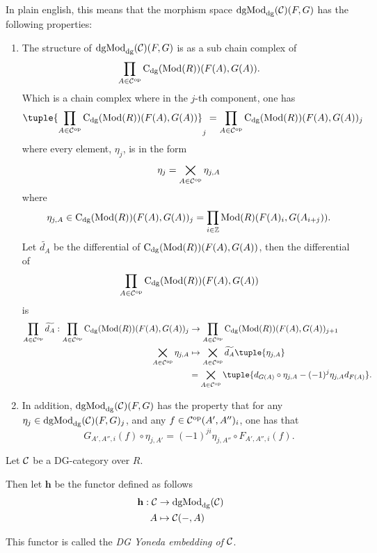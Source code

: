 \begin{remark}
    In plain english, this means that the morphism space \( \operatorname{dgMod}_{\operatorname{dg}}({\mathcal{C}})(F, G) \) has the following properties:
    \begin{enumerate}
        \item {
            The structure of \( \operatorname{dgMod}_{\operatorname{dg}}({\mathcal{C}})(F, G) \) is as a sub chain complex of
            \[
                \prod_{A \in {\mathcal{C}}^{\operatorname{op}}} \operatorname{C}_{\operatorname{dg}}(\operatorname{Mod}(R))(F(A), G(A)).
            \]
            Which is a chain complex where in the \( j \)-th component, one has
            \[
                \tuple{ \prod_{A \in \Cc^{\op}} \C_{\dg}(\Mod(R))(F(A), G(A)) }_j = \prod_{A \in \Cc^{\op}} \C_{\dg}(\Mod(R))(F(A), G(A))_j
            \]
            where every element, \( \eta_j \), is in the form
            \[
                \eta_j = \bigtimes_{A \in {\mathcal{C}}^{\operatorname{op}}} \eta_{j, A}
            \]
            where
            \[
                \eta_{j, A} \in \operatorname{C}_{\operatorname{dg}}(\operatorname{Mod}(R))(F(A), G(A))_j = \prod_{i \in {\mathbb{Z}}} \operatorname{Mod}(R)(F(A)_i, G(A_{i + j})).
            \]
            Let \( \widetilde{d_A} \) be the differential of \( \operatorname{C}_{\operatorname{dg}}(\operatorname{Mod}(R))(F(A), G(A)) \), then the differential of
            \[
                \prod_{A \in {\mathcal{C}}^{\operatorname{op}}} \operatorname{C}_{\operatorname{dg}}(\operatorname{Mod}(R))(F(A), G(A))
            \] is
            \begin{align*}
                \prod_{A \in \Cc^{\op}} \widetilde{d_A} : \prod_{A \in \Cc^{\op}} \C_{\dg}(\Mod(R))(F(A), G(A))_j &\to \prod_{A \in \Cc^{\op}} \C_{\dg}(\Mod(R))(F(A), G(A))_{j + 1} \\
                \bigtimes_{A \in \Cc^{\op}} \eta_{j, A} &\mapsto \bigtimes_{A \in \Cc^{\op}} \widetilde{d_A}\tuple{\eta_{j, A}} \\
                &= \bigtimes_{A \in \Cc^{\op}} \tuple{ d_{G(A)} \circ \eta_{j, A} - (-1)^j \eta_{j, A} d_{F(A)} }.
            \end{align*}
        }
        \item {
            In addition, \( \operatorname{dgMod}_{\operatorname{dg}}({\mathcal{C}})(F, G) \) has the property that for any \( \eta_j \in \operatorname{dgMod}_{\operatorname{dg}}({\mathcal{C}})(F, G)_j \), and any \( f \in {\mathcal{C}}^{\operatorname{op}}(A', A'')_i \), one has that
            \[
                G_{A', A'', i}(f) \circ \eta_{j, A'} = (-1)^{ji} \eta_{j, A''} \circ F_{A', A'', i}(f).
            \]
        }
    \end{enumerate} 
\end{remark}

\begin{definition}
    \label{def:DG_Yoneda_embedding}
    Let \( {\mathcal{C}} \) be a DG-category over \( R \).
    
    Then let \( \mathbf{h} \) be the functor defined as follows
    \begin{align*}
        \mathbf{h}: {\mathcal{C}} &\to \operatorname{dgMod}_{\operatorname{dg}}({\mathcal{C}}) \\
        A &\mapsto {\mathcal{C}}(-, A)
    \end{align*}

    This functor is called the \emph{DG Yoneda embedding of \( {\mathcal{C}} \)}.
\end{definition}

